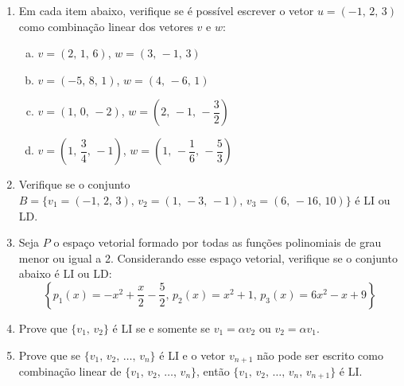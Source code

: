 \documentclass[12pt,a4paper]{article}
\begin{document}
\begin{enumerate}

  \item Em cada item abaixo, verifique se é possível escrever o vetor 
    $u = (-1,\, 2,\, 3)$ como combinação linear dos vetores $v$ e $w$:
    \begin{enumerate}[(a)]
      \item $v = (2,\, 1,\, 6)$,  $w = (3,\, -1,\, 3)$
      \item $v = (-5,\, 8,\, 1)$, $w = (4,\, -6,\, 1)$
      \item $v = (1,\, 0,\, -2)$, $w = \left(2,\, -1,\,-\dfrac{3}{2}\right)$
      \item $v = \left(1,\, \dfrac{3}{4},\, -1\right)$, $w = \left(1,\, -\dfrac{1}{6},\, -\dfrac{5}{3}\right)$
    \end{enumerate}
   
  \item Verifique se o conjunto 
    $B = \{v_1 = (-1,\, 2,\, 3),\, v_2 = (1,\, -3,\, -1),\, v_3 = (6,\, -16,\, 10)\}$ é
    LI ou LD.

  \item Seja $P$ o espaço vetorial formado por todas as funções polinomiais de
    grau menor ou igual a 2. Considerando esse espaço vetorial, verifique se o conjunto
    abaixo é LI ou LD: 
    $$\left\{p_1(x) = -x^2 + \dfrac{x}{2} - \dfrac{5}{2},\, p_2(x) = x^2 + 1,\, p_3(x) = 6x^2  - x + 9\right\}$$
    
  \item Prove que $\{v_1,\,v_2\}$ é LI se e somente se $v_1 =\alpha v_2$ ou $v_2 =\alpha v_1$.
    
  \item Prove que se $\{v_1,\, v_2,\, \ldots,\, v_n\}$ é LI e o vetor $v_{n+1}$ não
    pode ser escrito como combinação linear de $\{v_1,\, v_2,\, \ldots,\, v_n\}$,
    então $\{v_1,\, v_2,\, \ldots,\, v_n,\, v_{n+1}\}$ é LI.
  
\end{enumerate}
\end{document}
